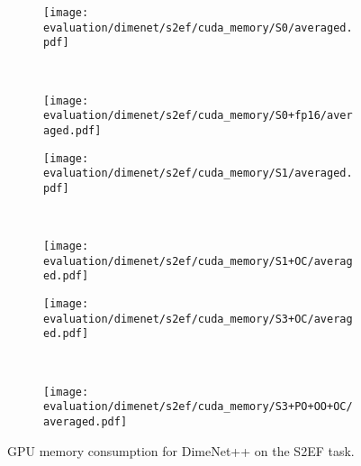 \begin{figure}[H]

    \centering

    \begin{subfigure}[t]{0.45\textwidth}
        \centering
        \texttt{[image: evaluation/dimenet/s2ef/cuda\_memory/S0/averaged.pdf]}
    \end{subfigure}%
    ~
    \begin{subfigure}[t]{0.45\textwidth}
        \centering
        \texttt{[image: evaluation/dimenet/s2ef/cuda\_memory/S0+fp16/averaged.pdf]}
    \end{subfigure}

    \begin{subfigure}[t]{0.45\textwidth}
        \centering
        \texttt{[image: evaluation/dimenet/s2ef/cuda\_memory/S1/averaged.pdf]}
    \end{subfigure}%
    ~
    \begin{subfigure}[t]{0.45\textwidth}
        \centering
        \texttt{[image: evaluation/dimenet/s2ef/cuda\_memory/S1+OC/averaged.pdf]}
    \end{subfigure}

    \begin{subfigure}[t]{0.45\textwidth}
        \centering
        \texttt{[image: evaluation/dimenet/s2ef/cuda\_memory/S3+OC/averaged.pdf]}
    \end{subfigure}%
    ~
    \begin{subfigure}[t]{0.45\textwidth}
        \centering
        \texttt{[image: evaluation/dimenet/s2ef/cuda\_memory/S3+PO+OO+OC/averaged.pdf]}
    \end{subfigure}

    \caption{GPU memory consumption for DimeNet++ on the S2EF task.}
    
\end{figure}

